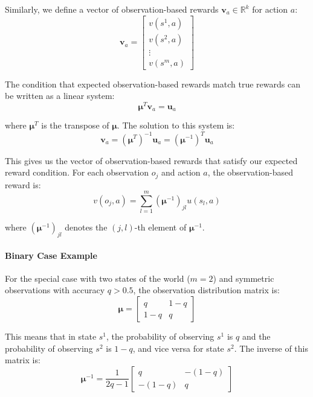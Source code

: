 Similarly, we define a vector of observation-based rewards $\bm{v}_{a} \in \mathbb{R}
    ^{k}$ for action $a$:
\begin{equation}
    \bm{v}_{a} =
    \begin{bmatrix}
        v(s^{1}, a) \\
        v(s^{2}, a) \\
        \vdots      \\
        v(s^{m}, a)
    \end{bmatrix}
\end{equation}

The condition that expected observation-based rewards match true rewards can be written
as a linear system:
\begin{equation}
    \bm{\mu}^{T} \bm{v}_{a} = \bm{u}_{a}
\end{equation}

where $\bm{\mu}^{T}$ is the transpose of $\bm{\mu}$. The solution to this system
is:
\begin{equation}
    \bm{v}_{a} = (\bm{\mu}^{T})^{-1}\bm{u}_{a} = (\bm{\mu}^{-1})^{T} \bm{u}_{a}
\end{equation}

This gives us the vector of observation-based rewards that satisfy our expected
reward condition. For each observation $o_{j}$ and action $a$, the observation-based
reward is:
\begin{equation}
    v(o_{j}, a) = \sum_{l=1}^{m} \left( \bm{\mu}^{-1}\right)_{jl}u(s_{l}, a)
\end{equation}

where $\left( \bm{\mu}^{-1}\right)_{jl}$ denotes the $(j, l)$-th element of
$\bm{\mu}^{-1}$.
\paragraph{Binary Case Example}
For the special case with two states of the world ($m = 2$) and symmetric
observations with accuracy $q > 0.5$, the observation distribution matrix is:
\begin{equation}
    \bm{\mu}=
    \begin{bmatrix}
        q   & 1-q \\
        1-q & q
    \end{bmatrix}
\end{equation}

This means that in state $s^{1}$, the probability of observing $s^{1}$ is $q$
and the probability of observing $s^{2}$ is $1-q$, and vice versa for state $s^{2}$.
The inverse of this matrix is:
\begin{equation}
    \bm{\mu}^{-1}= \frac{1}{2q-1}
    \begin{bmatrix}
        q      & -(1-q) \\
        -(1-q) & q
    \end{bmatrix}
\end{equation}

